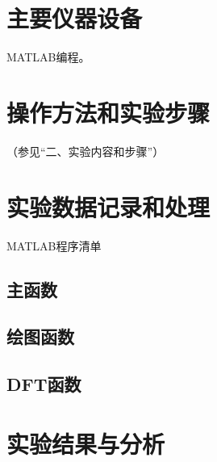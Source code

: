 \documentclass{../source/Experiment copy}
\begin{document}
\section{主要仪器设备}

MATLAB编程。

\section{操作方法和实验步骤}

（参见“二、实验内容和步骤”）

\section{实验数据记录和处理}

MATLAB程序清单
\subsection{主函数}

\subsection{绘图函数}

\subsection{DFT函数}

\section{实验结果与分析}
\end{document}
